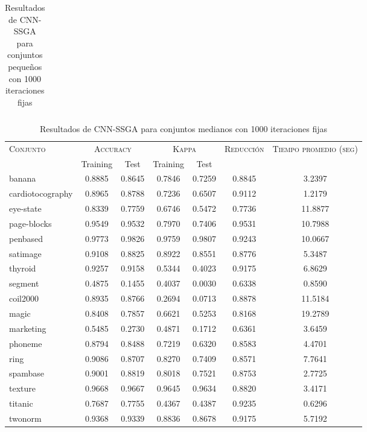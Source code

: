 \begin{table}[]
\begin{tabular}{l c c c c c c}
\hline
\end{tabular}
\caption{Resultados de CNN-SSGA para conjuntos pequeños con 1000 iteraciones fijas}
\label{res-peq-cnn-ssga}
\end{table}


\begin{table}[]
\centering
\begin{tabular}{l c c c c c c}
\hline
\multirow{2}{*}{\textsc{Conjunto}}
	& \multicolumn{2}{c}{\textsc{Accuracy}}
	& \multicolumn{2}{c}{\textsc{Kappa}}
	& \textsc{Reducción}
	& \textsc{Tiempo promedio (seg)} \\
	& Training & Test
	& Training & Test \\ 
\hline
\hline

banana & 0.8885 & 0.8645 & 0.7846 & 0.7259 & 0.8845 & 3.2397 \\
cardiotocography & 0.8965 & 0.8788 & 0.7236 & 0.6507 & 0.9112 & 1.2179 \\
eye-state & 0.8339 & 0.7759 & 0.6746 & 0.5472 & 0.7736 & 11.8877 \\
page-blocks & 0.9549 & 0.9532 & 0.7970 & 0.7406 & 0.9531 & 10.7988 \\
penbased & 0.9773 & 0.9826 & 0.9759 & 0.9807 & 0.9243 & 10.0667 \\
satimage & 0.9108 & 0.8825 & 0.8922 & 0.8551 & 0.8776 & 5.3487 \\
thyroid & 0.9257 & 0.9158 & 0.5344 & 0.4023 & 0.9175 & 6.8629 \\
segment & 0.4875 & 0.1455 & 0.4037 & 0.0030 & 0.6338 & 0.8590 \\
coil2000 & 0.8935 & 0.8766 & 0.2694 & 0.0713 & 0.8878 & 11.5184 \\
magic & 0.8408 & 0.7857 & 0.6621 & 0.5253 & 0.8168 & 19.2789 \\
marketing & 0.5485 & 0.2730 & 0.4871 & 0.1712 & 0.6361 & 3.6459 \\
phoneme & 0.8794 & 0.8488 & 0.7219 & 0.6320 & 0.8583 & 4.4701 \\
ring & 0.9086 & 0.8707 & 0.8270 & 0.7409 & 0.8571 & 7.7641 \\
spambase & 0.9001 & 0.8819 & 0.8018 & 0.7521 & 0.8753 & 2.7725 \\
texture & 0.9668 & 0.9667 & 0.9645 & 0.9634 & 0.8820 & 3.4171 \\
titanic & 0.7687 & 0.7755 & 0.4367 & 0.4387 & 0.9235 & 0.6296 \\
twonorm & 0.9368 & 0.9339 & 0.8836 & 0.8678 & 0.9175 & 5.7192 \\

\hline
\end{tabular}
\caption{Resultados de CNN-SSGA para conjuntos medianos con 1000 iteraciones fijas}
\label{res-med-cnn-ssga}
\end{table}


